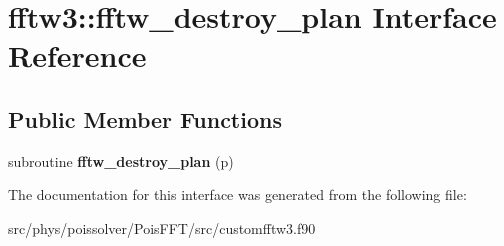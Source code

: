 \hypertarget{interfacefftw3_1_1fftw__destroy__plan}{}\section{fftw3\+:\+:fftw\+\_\+destroy\+\_\+plan Interface Reference}
\label{interfacefftw3_1_1fftw__destroy__plan}
\subsection*{Public Member Functions}
\begin{DoxyCompactItemize}
\item 
subroutine {\bfseries fftw\+\_\+destroy\+\_\+plan} (p)\hypertarget{interfacefftw3_1_1fftw__destroy__plan_adc972d6f3fa6cc3e49db1eabd55cdfab}{}\label{interfacefftw3_1_1fftw__destroy__plan_adc972d6f3fa6cc3e49db1eabd55cdfab}

\end{DoxyCompactItemize}


The documentation for this interface was generated from the following file\+:\begin{DoxyCompactItemize}
\item 
src/phys/poissolver/\+Pois\+F\+F\+T/src/customfftw3.\+f90\end{DoxyCompactItemize}
